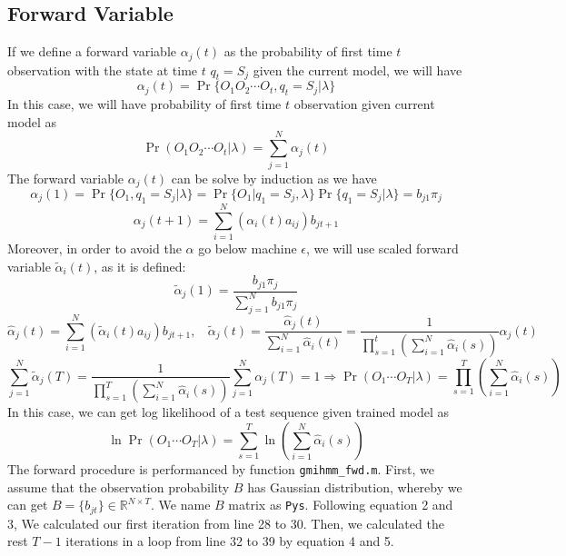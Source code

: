\documentclass{article}
\begin{document}
	\subsection{Forward Variable}
	If we define a forward variable $\alpha_j(t)$ as the probability of first time $t$  observation with the state at time $t$ $q_t=S_j$ given the current model, we will have 
	\begin{equation}
	\alpha_j(t)=\Pr\{O_1O_2\cdots O_t,q_t=S_j|\lambda\}
	\end{equation}
	In this case, we will have probability of first time $t$ observation given current model as
	\begin{equation}
	\Pr(O_1O_2\cdots O_t|\lambda)=\sum_{j=1}^{N}\alpha_j(t)
	\end{equation}
	The forward variable $\alpha_j(t)$ can be solve by induction as we have
	\begin{equation}
	\alpha_j(1)=\Pr\{O_1,q_1=S_j|\lambda\}=\Pr\{O_1|q_1=S_j,\lambda\}\Pr\{q_1=S_j|\lambda\}=b_{j1}\pi_j
	\end{equation}
	\begin{equation}
	\alpha_j(t+1)=\sum_{i=1}^N(\alpha_i(t)a_{ij})b_{jt+1}
	\end{equation}
	Moreover, in order to avoid the $\alpha$  go below machine $\epsilon$, we will use scaled forward variable $\tilde{\alpha}_i(t)$, as it is defined:
	$$\tilde{\alpha}_j(1)=\frac{b_{j1}\pi_j}{\sum_{j=1}^Nb_{j1}\pi_j}$$
	$$ \hat{\alpha}_j(t)=\sum_{i=1}^N(\tilde{\alpha}_i(t)a_{ij})b_{jt+1},~~~~\tilde{\alpha}_j(t)=\frac{\hat{\alpha}_j(t)}{\sum_{i=1}^{N}\hat{\alpha}_i(t)}=\frac{1}{\prod_{s=1}^{t}(\sum_{i=1}^N\hat{\alpha}_i(s))}\alpha_j(t)$$
	$$\sum_{j=1}^N\tilde{\alpha}_j(T)=\frac{1}{\prod_{s=1}^{T}(\sum_{i=1}^N\hat{\alpha}_i(s))}\sum_{j=1}^N\alpha_j(T)=1\Rightarrow\Pr(O_1\cdots O_T|\lambda)={\prod_{s=1}^{T}(\sum_{i=1}^N\hat{\alpha}_i(s))}$$
	In this case, we can get log likelihood of a test sequence given trained model as
	 $$\ln\Pr(O_1\cdots O_T|\lambda)={\sum_{s=1}^{T}\ln(\sum_{i=1}^N\hat{\alpha}_i(s))}	$$
	The forward procedure is performanced by function \texttt{gmihmm\_fwd.m}. First, we assume that the observation probability $B$ has Gaussian distribution, whereby we can get $B=\{b_{jt}\}\in\mathbb{R}^{N\times T}$. We name $B$ matrix as \texttt{Pys}. Following equation 2 and 3, We calculated our first iteration from line 28 to 30. Then, we calculated the rest $T-1$ iterations in a loop from line 32 to 39 by equation 4 and 5. 
\end{document}
